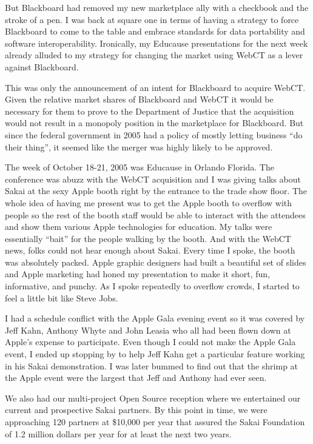 \documentclass[12pt]{book}
\begin{document}
But Blackboard had removed my new marketplace ally
with a checkbook and the stroke of
a pen. I was back at square one in terms of having
a strategy to force Blackboard to come to the table
and embrace standards for data portability and software
interoperability.
Ironically, my Educause presentations for the next week
already alluded to my strategy for changing the market
using WebCT as a lever against Blackboard.

This was only the announcement of an intent for Blackboard
to acquire WebCT.  Given the relative market shares of
Blackboard and WebCT it would be necessary for them to
prove to the Department of Justice that the
acquisition would not result in a monopoly
position in the marketplace for Blackboard.  But since
the federal government in 2005 had a policy of mostly
letting business ``do their thing'', it seemed like the
merger was highly likely to be approved.

The week of October 18-21, 2005 was Educause in Orlando
Florida.  The conference was abuzz with the WebCT
acquisition and I was giving talks about Sakai
at the sexy Apple booth right by the entrance
to the trade show floor.  The whole idea of having me
present was to get the Apple booth to overflow with people
so the rest of the booth staff would be able to interact
with the attendees and show them various Apple technologies
for education.  My talks were essentially ``bait''
for the people walking by the booth.   And with the WebCT
news, folks could not hear enough about Sakai.  Every
time I spoke, the booth was absolutely packed.  Apple
graphic designers had built a beautiful set of slides
and Apple marketing had honed my presentation to make
it short, fun, informative, and punchy.  As I spoke
repeatedly to overflow crowds, I started to feel
a little bit like Steve Jobs.

I had a schedule conflict with the Apple Gala evening event
so it was covered by Jeff Kahn, Anthony Whyte and
John Leasia who all had been flown down at Apple's
expense to participate.  Even though I could not make the
Apple Gala event, I ended up stopping by to help Jeff Kahn
get a particular feature working in his Sakai
demonstration.  I was later bummed to find out that the
shrimp at the Apple event were the largest that Jeff and
Anthony had ever seen.

We also had our multi-project Open Source reception where
we entertained our current and prospective Sakai partners.
By this point in time, we were approaching 120 partners
at \$10,000 per year that assured the
Sakai Foundation of 1.2 million dollars per year for at
least the next two years.
\end{document}
